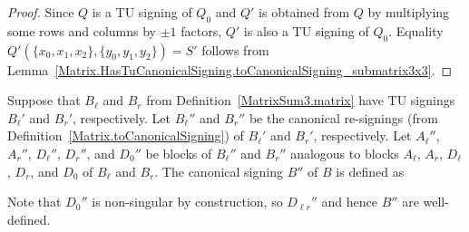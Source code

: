 \begin{proof}
    \leanok
    Since $Q$ is a TU signing of $Q_{0}$ and $Q'$ is obtained from $Q$ by multiplying some rows and columns by $\pm 1$ factors, $Q'$ is also a TU signing of $Q_{0}$. Equality $Q' (\{x_{0}, x_{1}, x_{2}\}, \{y_{0}, y_{1}, y_{2}\}) = S'$ follows from Lemma~\ref{Matrix.HasTuCanonicalSigning.toCanonicalSigning_submatrix3x3}.
\end{proof}

\begin{definition}
    \label{MatrixSum3.toCanonicalSigning}
    \leanok
    Suppose that $B_{\ell}$ and $B_{r}$ from Definition~\ref{MatrixSum3.matrix} have TU signings $B_{\ell}'$ and $B_{r}'$, respectively. Let $B_{\ell}''$ and $B_{r}''$ be the canonical re-signings (from Definition~\ref{Matrix.toCanonicalSigning}) of $B_{\ell}'$ and $B_{r}'$, respectively. Let $A_{\ell}''$, $A_{r}''$, $D_{\ell}''$, $D_{r}''$, and $D_{0}''$ be blocks of $B_{\ell}''$ and $B_{r}''$ analogous to blocks $A_{\ell}$, $A_{r}$, $D_{\ell}$, $D_{r}$, and $D_{0}$ of $B_{\ell}$ and $B_{r}$. The canonical signing $B''$ of $B$ is defined as
    \begin{center}
        \noindent
    \end{center}
    Note that $D_{0}''$ is non-singular by construction, so $D_{\ell r}''$ and hence $B''$ are well-defined.
\end{definition}


